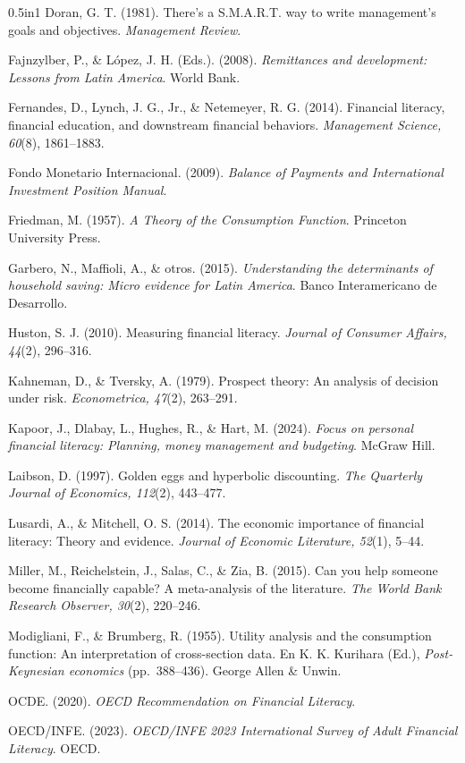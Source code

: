 \documentclass[12pt,letterpaper]{article}
\begin{document}
\begin{hangparas}{0.5in}{1}
Doran, G. T. (1981). There's a S.M.A.R.T. way to write management's goals and objectives. \emph{Management Review}.

Fajnzylber, P., \& López, J. H. (Eds.). (2008). \emph{Remittances and development: Lessons from Latin America}. World Bank.

Fernandes, D., Lynch, J. G., Jr., \& Netemeyer, R. G. (2014). Financial literacy, financial education, and downstream financial behaviors. \emph{Management Science, 60}(8), 1861--1883.

Fondo Monetario Internacional. (2009). \emph{Balance of Payments and International Investment Position Manual}.

Friedman, M. (1957). \emph{A Theory of the Consumption Function}. Princeton University Press.

Garbero, N., Maffioli, A., \& otros. (2015). \emph{Understanding the determinants of household saving: Micro evidence for Latin America}. Banco Interamericano de Desarrollo.

Huston, S. J. (2010). Measuring financial literacy. \emph{Journal of Consumer Affairs, 44}(2), 296--316.

Kahneman, D., \& Tversky, A. (1979). Prospect theory: An analysis of decision under risk. \emph{Econometrica, 47}(2), 263--291.

Kapoor, J., Dlabay, L., Hughes, R., \& Hart, M. (2024). \emph{Focus on personal financial literacy: Planning, money management and budgeting}. McGraw Hill.

Laibson, D. (1997). Golden eggs and hyperbolic discounting. \emph{The Quarterly Journal of Economics, 112}(2), 443--477.

Lusardi, A., \& Mitchell, O. S. (2014). The economic importance of financial literacy: Theory and evidence. \emph{Journal of Economic Literature, 52}(1), 5--44.

Miller, M., Reichelstein, J., Salas, C., \& Zia, B. (2015). Can you help someone become financially capable? A meta-analysis of the literature. \emph{The World Bank Research Observer, 30}(2), 220--246.

Modigliani, F., \& Brumberg, R. (1955). Utility analysis and the consumption function: An interpretation of cross-section data. En K. K. Kurihara (Ed.), \emph{Post-Keynesian economics} (pp.~388--436). George Allen \& Unwin.

OCDE. (2020). \emph{OECD Recommendation on Financial Literacy}.

OECD/INFE. (2023). \emph{OECD/INFE 2023 International Survey of Adult Financial Literacy}. OECD.


\end{hangparas}
\end{document}
